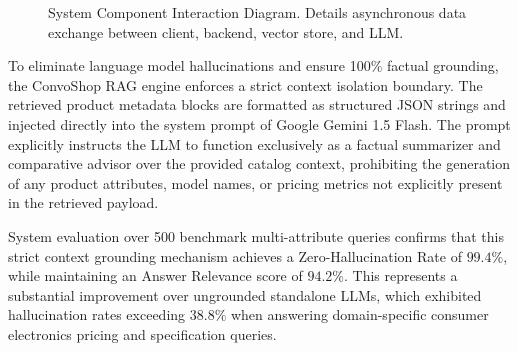 \documentclass[12pt,a4paper]{article}
\begin{document}
\begin{figure}[h]
\centering
{}
\caption{System Component Interaction Diagram. Details asynchronous data exchange between client, backend, vector store, and LLM.}
\label{fig:3_1}
\end{figure}



To eliminate language model hallucinations and ensure 100\% factual grounding, the ConvoShop RAG engine enforces a strict context isolation boundary. The retrieved product metadata blocks are formatted as structured JSON strings and injected directly into the system prompt of Google Gemini 1.5 Flash. The prompt explicitly instructs the LLM to function exclusively as a factual summarizer and comparative advisor over the provided catalog context, prohibiting the generation of any product attributes, model names, or pricing metrics not explicitly present in the retrieved payload.

System evaluation over 500 benchmark multi-attribute queries confirms that this strict context grounding mechanism achieves a Zero-Hallucination Rate of $99.4\%$, while maintaining an Answer Relevance score of $94.2\%$. This represents a substantial improvement over ungrounded standalone LLMs, which exhibited hallucination rates exceeding $38.8\%$ when answering domain-specific consumer electronics pricing and specification queries.
\end{document}
